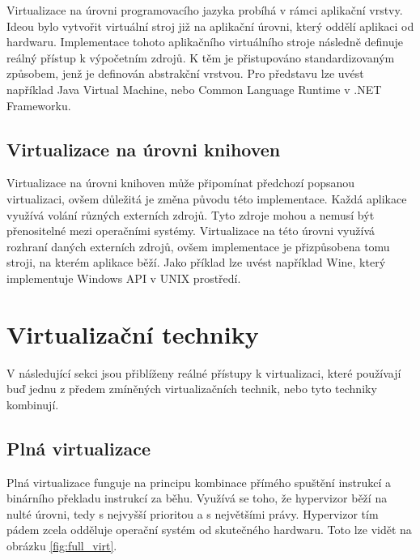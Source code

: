 Virtualizace na úrovni programovacího jazyka probíhá v rámci aplikační vrstvy. Ideou bylo vytvořit virtuální stroj již na aplikační úrovni, který oddělí aplikaci od hardwaru. Implementace tohoto aplikačního virtuálního stroje následně definuje reálný přístup k výpočetním zdrojů. K těm je přistupováno standardizovaným způsobem, jenž je definován abstrakční vrstvou. Pro představu lze uvést například Java Virtual Machine, nebo Common Language Runtime v .NET Frameworku.\,\cite{chiueh2005survey}


\subsection{Virtualizace na úrovni knihoven}

Virtualizace na úrovni knihoven může připomínat předchozí popsanou virtualizaci, ovšem důležitá je změna původu této implementace. Každá aplikace využívá volání různých externích zdrojů. Tyto zdroje mohou a nemusí být přenositelné mezi operačními systémy. Virtualizace na této úrovni využívá rozhraní daných externích zdrojů, ovšem implementace je přizpůsobena tomu stroji, na kterém aplikace běží. Jako příklad lze uvést například Wine, který implementuje Windows API v UNIX prostředí.\,\cite{chiueh2005survey}


\section{Virtualizační techniky}

V následující sekci jsou přiblíženy reálné přístupy k virtualizaci, které používají buď jednu z předem zmíněných virtualizačních technik, nebo tyto techniky kombinují. 

\subsection{Plná virtualizace}

Plná virtualizace funguje na principu kombinace přímého spuštění instrukcí a binárního překladu instrukcí za běhu. Využívá se toho, že hypervizor běží na nulté úrovni, tedy s nejvyšší prioritou a s největšími právy. Hypervizor tím pádem zcela odděluje operační systém od skutečného hardwaru. Toto lze vidět na obrázku \ref{fig:full_virt}.\,\cite{4709159}

